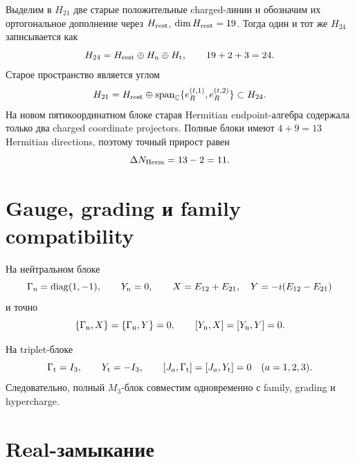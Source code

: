 Выделим в $H_{21}$ две старые положительные charged-линии и обозначим их
ортогональное дополнение через $H_{\rm rest}$, $\dim H_{\rm rest}=19$.
Тогда один и тот же $H_{24}$ записывается как
\begin{equation}
 H_{24}=H_{\rm rest}\oplus H_{\rm n}\oplus H_{\rm t},
 \qquad 19+2+3=24.
 \label{eq:v9-finite-module-h24-splitting}
\end{equation}
Старое пространство является углом
\begin{equation}
 H_{21}=H_{\rm rest}\oplus
 \operatorname{span}_{\mathbb C}\{e_R^{(t,1)},e_R^{(t,2)}\}
 \subset H_{24}.
 \label{eq:v9-finite-module-old-corner}
\end{equation}
На новом пятикоординатном блоке старая Hermitian endpoint-алгебра содержала
только два charged coordinate projectors. Полные блоки имеют $4+9=13$
Hermitian directions, поэтому точный прирост равен
\begin{equation}
 \Delta N_{\rm Herm}=13-2=11.
 \label{eq:v9-finite-module-hermitian-increment}
\end{equation}

\section{Gauge, grading и family compatibility}

На нейтральном блоке
\begin{equation}
 \Gamma_{\rm n}=\operatorname{diag}(1,-1),\qquad
 Y_{\rm n}=0,\qquad
 X=E_{12}+E_{21},\quad Y=-i(E_{12}-E_{21})
 \label{eq:v9-finite-module-neutral-data}
\end{equation}
и точно
\begin{equation}
 \{\Gamma_{\rm n},X\}=\{\Gamma_{\rm n},Y\}=0,
 \qquad [Y_{\rm n},X]=[Y_{\rm n},Y]=0.
 \label{eq:v9-finite-module-neutral-compatibility}
\end{equation}

На triplet-блоке
\begin{equation}
 \Gamma_{\rm t}=I_3,\qquad Y_{\rm t}=-I_3,
 \qquad [J_a,\Gamma_{\rm t}]=[J_a,Y_{\rm t}]=0
 \quad(a=1,2,3).
 \label{eq:v9-finite-module-triplet-compatibility}
\end{equation}
Следовательно, полный $M_3$-блок совместим одновременно с family,
grading и hypercharge.

\section{Real-замыкание}

